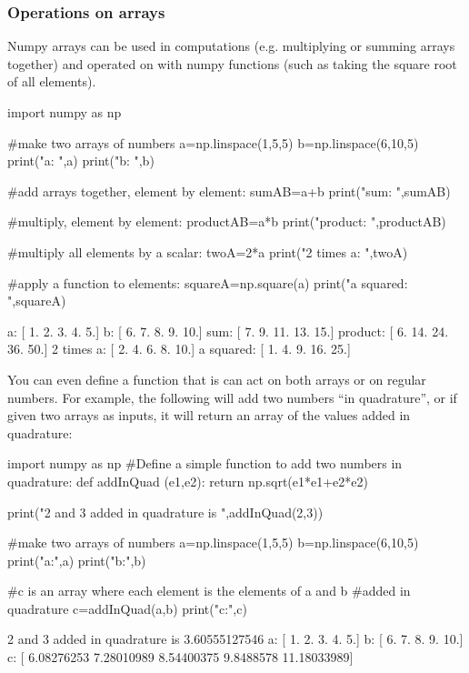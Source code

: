 \subsubsection{Operations on arrays}
Numpy arrays can be used in computations (e.g. multiplying or summing arrays together) and operated on with numpy functions (such as taking the square root of all elements).
 
\begin{python}[caption = \mbox{}]
import numpy as np

#make two arrays of numbers
a=np.linspace(1,5,5)
b=np.linspace(6,10,5)
print("a: ",a)
print("b: ",b)

#add arrays together, element by element:
sumAB=a+b
print("sum: ",sumAB)

#multiply, element by element:
productAB=a*b
print("product: ",productAB)

#multiply all elements by a scalar:
twoA=2*a
print("2 times a: ",twoA)

#apply a function to elements:
squareA=np.square(a)
print("a squared: ",squareA)
\end{python} 
\begin{poutput}
a: [ 1.  2.  3.  4.  5.]
b: [  6.   7.   8.   9.  10.]
sum: [  7.   9.  11.  13.  15.]
product: [  6.  14.  24.  36.  50.]
2 times a: [  2.   4.   6.   8.  10.]
a squared: [  1.   4.   9.  16.  25.]
\end{poutput}

You can even define a function that is can act on both arrays or on regular numbers. For example, the following will add two numbers ``in quadrature'', or if given two arrays as inputs, it will return an array of the values added in quadrature:
\begin{python}[caption = \mbox{}]
import numpy as np
#Define a simple function to add two numbers in quadrature:
def addInQuad (e1,e2):
  return np.sqrt(e1*e1+e2*e2)

print("2 and 3 added in quadrature is ",addInQuad(2,3))

#make two arrays of numbers
a=np.linspace(1,5,5)
b=np.linspace(6,10,5)
print("a:",a)
print("b:",b)

#c is an array where each element is the elements of a and b 
#added in quadrature
c=addInQuad(a,b)
print("c:",c)
\end{python} 
\begin{poutput}
2 and 3 added in quadrature is  3.60555127546
a: [ 1.  2.  3.  4.  5.]
b: [  6.   7.   8.   9.  10.]
c: [  6.08276253   7.28010989   8.54400375   9.8488578   11.18033989]
\end{poutput}
